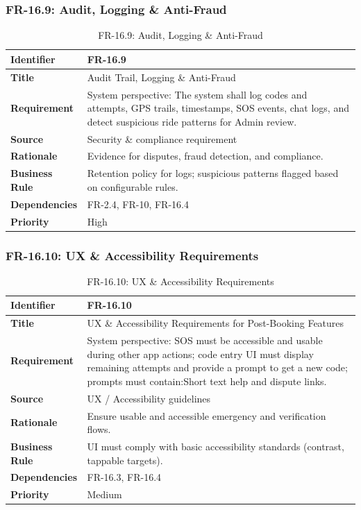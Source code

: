 \subsubsection{FR-16.9: Audit, Logging \& Anti-Fraud}

\begin{longtable}{|p{3cm}|p{12cm}|}
\caption{FR-16.9: Audit, Logging \& Anti-Fraud}
\label{tab:fr-16-9} \\
\hline
\rowcolor{lightgray!30}
\textbf{Identifier} & FR-16.9 \\
\hline
\textbf{Title} & Audit Trail, Logging \& Anti-Fraud \\
\hline
\textbf{Requirement} & System perspective: The system shall log codes and attempts, GPS trails, timestamps, SOS events, chat logs, and detect suspicious ride patterns for Admin review. \\
\hline
\textbf{Source} & Security \& compliance requirement \\
\hline
\textbf{Rationale} & Evidence for disputes, fraud detection, and compliance. \\
\hline
\textbf{Business Rule} & Retention policy for logs; suspicious patterns flagged based on configurable rules. \\
\hline
\textbf{Dependencies} & FR-2.4, FR-10, FR-16.4 \\
\hline
\textbf{Priority} & High \\
\hline
\end{longtable}

\subsubsection{FR-16.10: UX \& Accessibility Requirements}

\begin{longtable}{|p{3cm}|p{12cm}|}
\caption{FR-16.10: UX \& Accessibility Requirements}
\label{tab:fr-16-10} \\
\hline
\rowcolor{lightgray!30}
\textbf{Identifier} & FR-16.10 \\
\hline
\textbf{Title} & UX \& Accessibility Requirements for Post-Booking Features \\
\hline
\textbf{Requirement} & System perspective: SOS must be accessible and usable during other app actions; code entry UI must display remaining attempts and provide a prompt to get a new code; prompts must contain:Short text help and dispute links.\\
\hline
\textbf{Source} & UX / Accessibility guidelines \\
\hline
\textbf{Rationale} & Ensure usable and accessible emergency and verification flows. \\
\hline
\textbf{Business Rule} & UI must comply with basic accessibility standards (contrast, tappable targets). \\
\hline
\textbf{Dependencies} & FR-16.3, FR-16.4 \\
\hline
\textbf{Priority} & Medium \\
\hline
\end{longtable}

